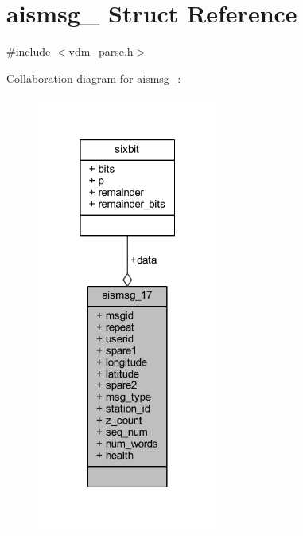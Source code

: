 \hypertarget{structaismsg__17}{}\section{aismsg\+\_ Struct Reference}
\label{structaismsg__17}


{\ttfamily \#include $<$vdm\+\_\+parse.\+h$>$}



Collaboration diagram for aismsg\+\_\+:
\nopagebreak
\begin{figure}[H]
\begin{center}
\leavevmode
\includegraphics[width=169pt]{structaismsg__17__coll__graph}
\end{center}
\end{figure}
